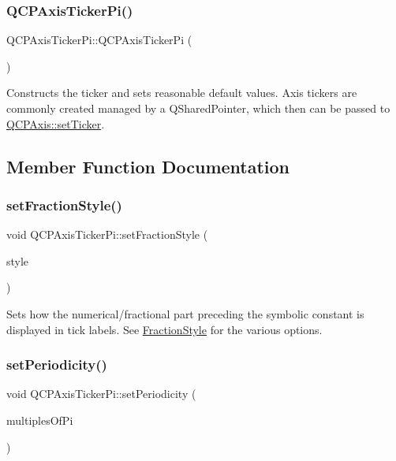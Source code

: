 \subsubsection{\texorpdfstring{Q\+C\+P\+Axis\+Ticker\+Pi()}{QCPAxisTickerPi()}}
{\footnotesize\ttfamily Q\+C\+P\+Axis\+Ticker\+Pi\+::\+Q\+C\+P\+Axis\+Ticker\+Pi (\begin{DoxyParamCaption}{ }\end{DoxyParamCaption})}

Constructs the ticker and sets reasonable default values. Axis tickers are commonly created managed by a Q\+Shared\+Pointer, which then can be passed to \hyperlink{classQCPAxis_a4ee03fcd2c74d05cd1a419b9af5cfbdc}{Q\+C\+P\+Axis\+::set\+Ticker}. 

\subsection{Member Function Documentation}
\mbox{\label{classQCPAxisTickerPi_a760c8af6ca68178e607556c4e5049d71}} 
\subsubsection{\texorpdfstring{set\+Fraction\+Style()}{setFractionStyle()}}
{\footnotesize\ttfamily void Q\+C\+P\+Axis\+Ticker\+Pi\+::set\+Fraction\+Style (\begin{DoxyParamCaption}\item[{\hyperlink{classQCPAxisTickerPi_a262f1534c7f0c79a7d5237f5d1e2c54c}{Q\+C\+P\+Axis\+Ticker\+Pi\+::\+Fraction\+Style}}]{style }\end{DoxyParamCaption})}

Sets how the numerical/fractional part preceding the symbolic constant is displayed in tick labels. See \hyperlink{classQCPAxisTickerPi_a262f1534c7f0c79a7d5237f5d1e2c54c}{Fraction\+Style} for the various options. \mbox{\label{classQCPAxisTickerPi_a58f538dc01860fb56e46970e28a87f03}} 
\subsubsection{\texorpdfstring{set\+Periodicity()}{setPeriodicity()}}
{\footnotesize\ttfamily void Q\+C\+P\+Axis\+Ticker\+Pi\+::set\+Periodicity (\begin{DoxyParamCaption}\item[{int}]{multiples\+Of\+Pi }\end{DoxyParamCaption})}

